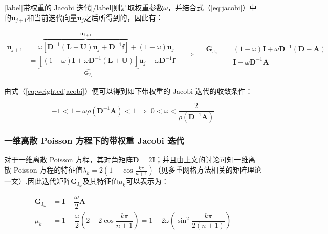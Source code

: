 \documentclass[12pt, UTF8, nofonts]{ctexart}
\begin{document}
[label]带权重的 Jacobi 迭代[/label]则是取权重参数$\omega$，并结合式（\ref{eq:jacobi}）中的$\boldsymbol{u}_{j+1}$和当前迭代向量$\boldsymbol{u}_j$之后所得到的，因此有：

\begin{equation}
  \label{eq:weightedjacobi}
  \begin{aligned}
    \boldsymbol{u}_{j+1} &= \omega \overbrace{\left[\boldsymbol{D}^{-1} (\boldsymbol{L}+\boldsymbol{U}) \boldsymbol{u}_{j} + \boldsymbol{D}^{-1}\boldsymbol{f}\right]}^{\boldsymbol{u}_{j+1}} + (1-\omega)\boldsymbol{u}_j \\
    &= \underbrace{\left[(1-\omega)\boldsymbol{I} + \omega\boldsymbol{D}^{-1}(\boldsymbol{L}+\boldsymbol{U})\right]}_{\boldsymbol{G}_{\mathrm{J}_\omega}} \boldsymbol{u}_{j} + \omega\boldsymbol{D}^{-1}\boldsymbol{f}
  \end{aligned} \quad\Rightarrow\quad
  \begin{aligned}
    \boldsymbol{G}_{\mathrm{J}_\omega} &= (1-\omega)\boldsymbol{I} + \omega\boldsymbol{D}^{-1}(\boldsymbol{D}-\boldsymbol{A}) \\
    &= \boldsymbol{I} - \omega\boldsymbol{D}^{-1}\boldsymbol{A}
  \end{aligned}
\end{equation}

由式（\ref{eq:weightedjacobi}）便可以得到如下带权重的 Jacobi 迭代的收敛条件：

\begin{equation}
  \label{eq:wjitercon}
  -1 < 1 - \omega\rho(\boldsymbol{D}^{-1}\boldsymbol{A}) < 1 \;\Rightarrow\;
  0 < \omega < \dfrac{2}{\rho(\boldsymbol{D}^{-1}\boldsymbol{A})}
\end{equation}



\subsubsection*{一维离散 Poisson 方程下的带权重 Jacobi 迭代}

对于一维离散 Poisson 方程，其对角矩阵$\boldsymbol{D}=2\boldsymbol{I}$；并且由上文的讨论可知一维离散 Poisson 方程的特征值$\lambda_k=2(1-\cos\frac{k\pi}{n+1})$（见多重网格方法相关的矩阵理论一文）,因此迭代矩阵$\boldsymbol{G}_{\mathrm{J}_\omega}$及其特征值$\mu_k$可以表示为：

\begin{equation}
  \label{eq:1dwjeig}
  \begin{aligned}
    \boldsymbol{G}_{\mathrm{J}_\omega} &= \boldsymbol{I} - \dfrac{\omega}{2}\boldsymbol{A} \\
    \mu_k &= 1 - \dfrac{\omega}{2}(2-2\cos\dfrac{k\pi}{n+1}) = 1 - 2\omega\left(\sin^2\dfrac{k\pi}{2(n+1)}\right) \\
  \end{aligned}
\end{equation}
\end{document}
